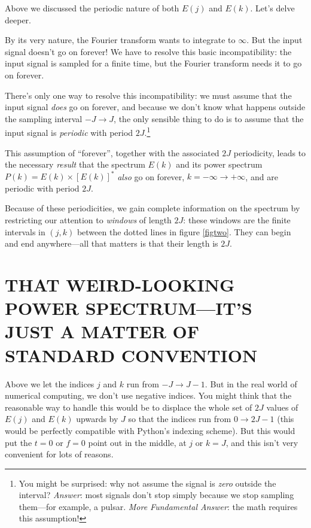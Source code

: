 \documentclass[11pt,preprint]{aastex}
\begin{document}
	Above we discussed the periodic nature of both $E(j)$ and
$E(k)$. Let's delve deeper. 

         By its very nature, the Fourier transform wants to integrate to
$\infty$. But the input signal doesn't go on forever! We have to resolve
this basic incompatibility: the input signal is sampled for a finite
time, but the Fourier transform needs it to go on forever. 

	There's only one way to resolve this incompatibility: we must
assume that the input signal {\it does} go on forever, and because we
don't know what happens outside the sampling interval $-J \rightarrow
J$, the only sensible thing to do is to assume that the input signal is
{\it periodic} with period $2J$.\footnote{You might be surprised: why
not assume the signal is {\it zero} outside the interval? {\it Answer}:
most signals don't stop simply because we stop sampling them---for
example, a pulsar. {\it More Fundamental Answer}: the math requires this
assumption!}

	This assumption of ``forever'', together with the associated
$2J$ periodicity, leads to the necessary {\it result} that the spectrum
$E(k)$ and its power spectrum $P(k) = E(k) \times [E(k)]^*$ {\it also}
go on forever, $k = -\infty \rightarrow +\infty$, and are periodic with
period $2J$. 

	Because of these periodicities, we gain complete information on
the spectrum by restricting our attention to {\it windows} of length
$2J$: these windows are the finite intervals in $(j, k)$ between the
dotted lines in figure \ref{figtwo}.  They can begin and end
anywhere---all that matters is that their length is $2J$. 


\section{THAT WEIRD-LOOKING POWER SPECTRUM---IT'S JUST A MATTER OF 
STANDARD CONVENTION}

          Above we let the indices $j$ and $k$ run from $-J \rightarrow
J-1$.  But in the real world of numerical computing, we don't use
negative indices.  You might think that the reasonable way to handle
this would be to displace the whole set of $2J$ values of $E(j)$ and
$E(k)$ upwards by $J$ so that the indices run from $0 \rightarrow 2J-1$
(this would be perfectly compatible with Python's indexing scheme).  But
this would put the $t=0$ or $f=0$ point out in the middle, at $j$ or
$k=J$, and this isn't very convenient for lots of reasons. 
\end{document}
